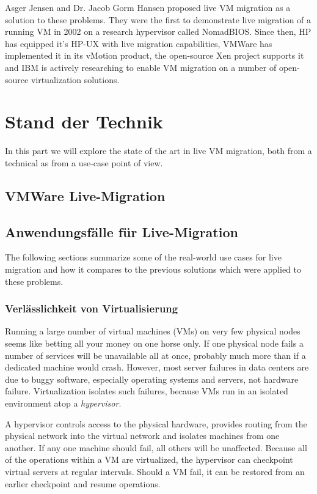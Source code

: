 \documentclass[a4paper,conference,compsoc]{IEEEtran}
\begin{document}
Asger Jensen and Dr. Jacob Gorm Hansen proposed live VM migration as a
solution to these problems. They were the first to demonstrate live
migration of a running VM in 2002 on a research hypervisor called
NomadBIOS. Since then, HP has equipped it's HP-UX with live migration
capabilities, VMWare has implemented it in its vMotion product, the
open-source Xen project supports it and IBM is actively researching to
enable VM migration on a number of open-source virtualization
solutions.

\section{Stand der Technik}
\label{sec:sota}

In this part we will explore the state of the art in live VM
migration, both from a technical as from a use-case point of view.

\subsection{VMWare Live-Migration}
\label{sec:livemigration}
\blindtext

\subsection{Anwendungsfälle für Live-Migration}

The following sections summarize some of the real-world use cases for
live migration and how it compares to the previous solutions which
were applied to these problems.

\subsubsection{Verlässlichkeit von Virtualisierung}

Running a large number of virtual machines (VMs) on very few physical
nodes seems like betting all your money on one horse only. If one
physical node fails a number of services will be unavailable all at
once, probably much more than if a dedicated machine would
crash. However, most server failures in data centers are due to buggy
software, especially operating systems and servers, not hardware
failure. Virtualization isolates such failures, because VMs run in an
isolated environment atop a \emph{hypervisor}.

A hypervisor controls access to the physical hardware, provides
routing from the physical network into the virtual network and
isolates machines from one another. If any one machine should fail,
all others will be unaffected. Because all of the operations within a
VM are virtualized, the hypervisor can checkpoint virtual servers at
regular intervals. Should a VM fail, it can be restored from an
earlier checkpoint and resume operations.
\end{document}
